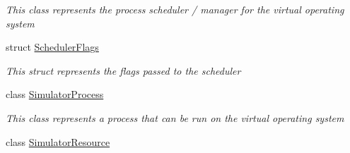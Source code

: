 \begin{DoxyCompactItemize}
\begin{DoxyCompactList}\small\item\em This class represents the process scheduler / manager for the virtual operating system \end{DoxyCompactList}\item 
struct \hyperlink{struct_c_p_u___o_s___simulator_1_1_operating___system_1_1_scheduler_flags}{Scheduler\+Flags}
\begin{DoxyCompactList}\small\item\em This struct represents the flags passed to the scheduler \end{DoxyCompactList}\item 
class \hyperlink{class_c_p_u___o_s___simulator_1_1_operating___system_1_1_simulator_process}{Simulator\+Process}
\begin{DoxyCompactList}\small\item\em This class represents a process that can be run on the virtual operating system \end{DoxyCompactList}\item 
class \hyperlink{class_c_p_u___o_s___simulator_1_1_operating___system_1_1_simulator_resource}{Simulator\+Resource}
\end{DoxyCompactItemize}
